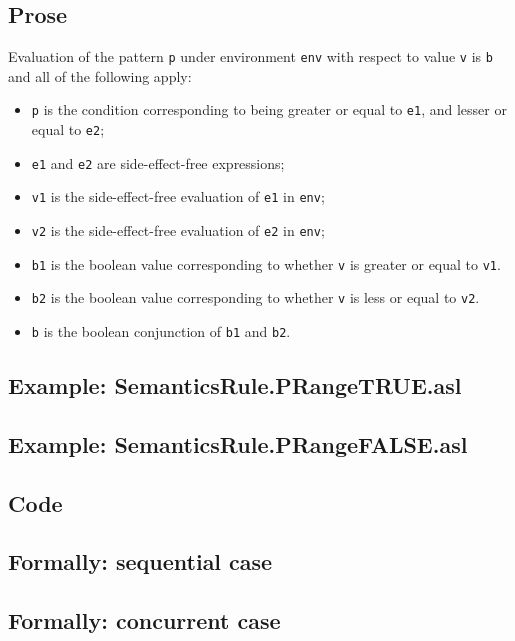 \documentclass{book}
\begin{document}
    \subsection{Prose}
  Evaluation of the pattern \texttt{p} under environment \texttt{env} with
  respect to value \texttt{v} is \texttt{b} and all of the following apply:
    \begin{itemize}
      \item \texttt{p} is the condition corresponding to being greater or equal
        to \texttt{e1}, and lesser or equal to \texttt{e2};
      \item \texttt{e1} and \texttt{e2} are side-effect-free expressions;
      \item \texttt{v1} is the side-effect-free evaluation of \texttt{e1} in
        \texttt{env};
      \item \texttt{v2} is the side-effect-free evaluation of \texttt{e2} in
        \texttt{env};
      \item \texttt{b1} is the boolean value corresponding to whether
        \texttt{v} is greater or equal to \texttt{v1}.
      \item \texttt{b2} is the boolean value corresponding to whether
        \texttt{v} is less or equal to \texttt{v2}.
      \item \texttt{b} is the boolean conjunction of \texttt{b1} and
        \texttt{b2}.
    \end{itemize}

    \subsection{Example: SemanticsRule.PRangeTRUE.asl}

    \subsection{Example: SemanticsRule.PRangeFALSE.asl}

  \subsection{Code}

\begin{emptyformal}
  \subsection{Formally: sequential case}

  \subsection{Formally: concurrent case}
\end{emptyformal}
\end{document}
